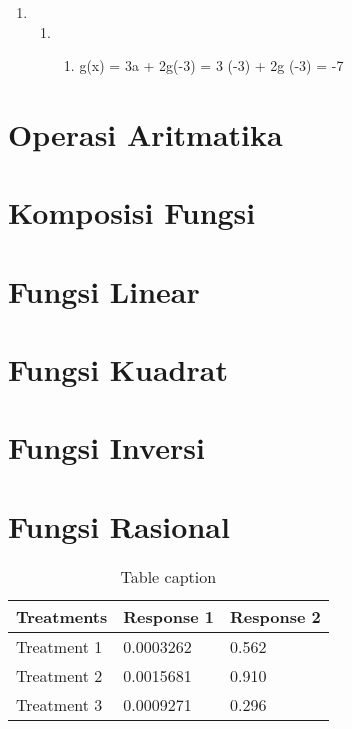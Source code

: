 \documentclass[11pt,fleqn]{book} %
\begin{document}
\noindent 

\begin{enumerate}
\item \begin{enumerate}
\item \begin{enumerate}
\item  g(x) = 3a + 2g(-3) = 3 (-3) + 2g (-3) = -7
\end{enumerate}
\end{enumerate}
\end{enumerate}

\noindent 

\noindent

\section{Operasi Aritmatika}

\section{Komposisi Fungsi}

\section{Fungsi Linear}

\section{Fungsi Kuadrat}

\section{Fungsi Inversi}

\section{Fungsi Rasional}

\begin{table}[h]
\centering
\begin{tabular}{l l l}
\toprule
\textbf{Treatments} & \textbf{Response 1} & \textbf{Response 2}\\
\midrule
Treatment 1 & 0.0003262 & 0.562 \\
Treatment 2 & 0.0015681 & 0.910 \\
Treatment 3 & 0.0009271 & 0.296 \\
\bottomrule
\end{tabular}
\caption{Table caption}
\end{table}
\end{document}
